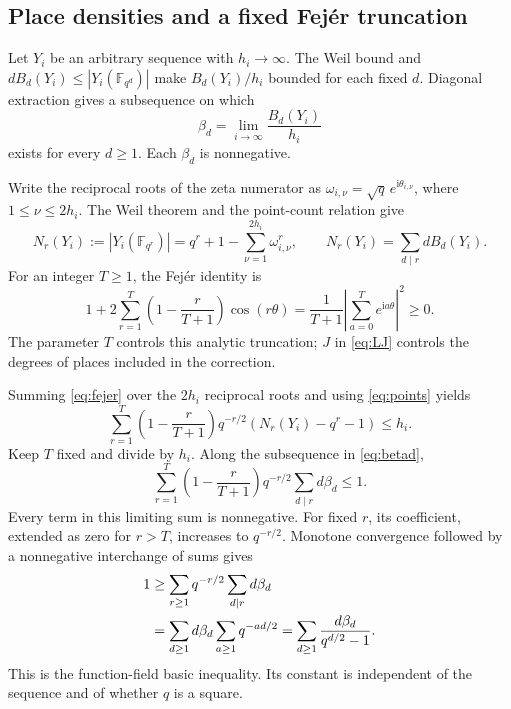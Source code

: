 \documentclass[12pt,onecolumn,draftclsnofoot,letterpaper]{IEEEtran}
\theoremstyle{remark}
\newcommand{\F}{\mathbb F}
\begin{document}
\subsection{Place densities and a fixed Fej\'er truncation}
Let $Y_i$ be an arbitrary sequence with $h_i\to\infty$. The Weil bound and
$dB_d(Y_i)\le|Y_i(\F_{q^d})|$ make $B_d(Y_i)/h_i$ bounded for each fixed $d$. Diagonal extraction gives a subsequence on which
\begin{equation}
 \beta_d=\lim_{i\to\infty}\frac{B_d(Y_i)}{h_i}
 \label{eq:betad}
\end{equation}
exists for every $d\ge1$. Each $\beta_d$ is nonnegative.

Write the reciprocal roots of the zeta numerator as
$\omega_{i,\nu}=\sqrt q\,e^{\mathrm i\theta_{i,\nu}}$, where
$1\le\nu\le2h_i$. The Weil theorem and the point-count relation give
\begin{equation}
 N_r(Y_i):=|Y_i(\F_{q^r})|
 =q^r+1-\sum_{\nu=1}^{2h_i}\omega_{i,\nu}^r,
 \qquad N_r(Y_i)=\sum_{d\mid r}dB_d(Y_i).
 \label{eq:points}
\end{equation}
For an integer $T\ge1$, the Fej\'er identity is
\begin{equation}
 1+2\sum_{r=1}^T\left(1-\frac r{T+1}\right)\cos(r\theta)
 =\frac1{T+1}\left|\sum_{a=0}^T e^{\mathrm i a\theta}\right|^2\ge0.
 \label{eq:fejer}
\end{equation}
The parameter $T$ controls this analytic truncation; $J$ in \eqref{eq:LJ} controls the degrees of places included in the correction.

Summing \eqref{eq:fejer} over the $2h_i$ reciprocal roots and using \eqref{eq:points} yields
\begin{equation}
 \sum_{r=1}^T\left(1-\frac r{T+1}\right)q^{-r/2}
       (N_r(Y_i)-q^r-1)\le h_i.
 \label{eq:fejerfinite}
\end{equation}
Keep $T$ fixed and divide by $h_i$. Along the subsequence in \eqref{eq:betad},
\begin{equation}
 \sum_{r=1}^T\left(1-\frac r{T+1}\right)q^{-r/2}
       \sum_{d\mid r}d\beta_d\le1.
 \label{eq:fejerlimit}
\end{equation}
Every term in this limiting sum is nonnegative. For fixed $r$, its coefficient, extended as zero for $r>T$, increases to $q^{-r/2}$. Monotone convergence followed by a nonnegative interchange of sums gives
\begin{align}
 1&\ge\sum_{r\ge1}q^{-r/2}\sum_{d\mid r}d\beta_d\notag\\
  &=\sum_{d\ge1}d\beta_d\sum_{a\ge1}q^{-ad/2}
   =\sum_{d\ge1}\frac{d\beta_d}{q^{d/2}-1}.
 \label{eq:basic}
\end{align}
This is the function-field basic inequality. Its constant is independent of the sequence and of whether $q$ is a square.
\end{document}
